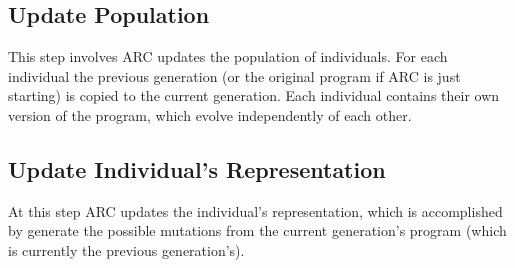 \subsection{Update Population}
\label{sec:update_population}

This step involves ARC updates the population of individuals. For each
individual the previous generation (or the original program if ARC is just
starting) is copied to the current generation. Each individual contains their
own version of the program, which evolve independently of each other.


\subsection{Update Individual's Representation}
\label{sec:update_individual_representation}

At this step ARC updates the individual's representation, which is accomplished
by generate the possible mutations from the current generation's program (which
is currently the previous generation's).



